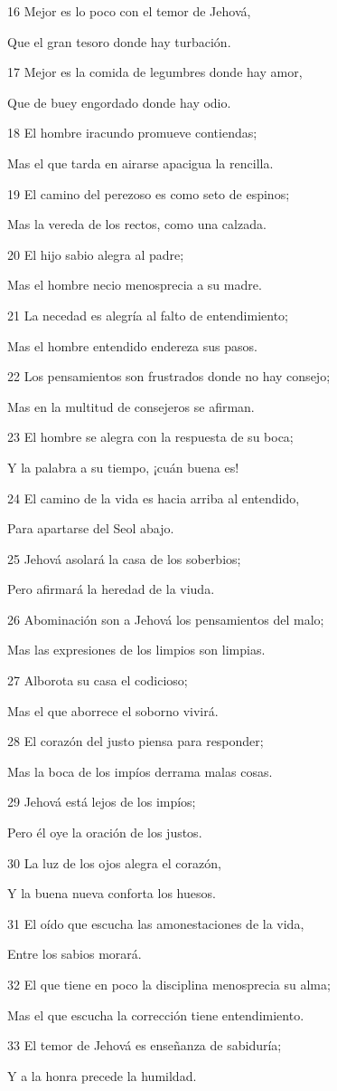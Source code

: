 \par 16 Mejor es lo poco con el temor de Jehová,
\par Que el gran tesoro donde hay turbación.
\par 17 Mejor es la comida de legumbres donde hay amor,
\par Que de buey engordado donde hay odio.
\par 18 El hombre iracundo promueve contiendas;
\par Mas el que tarda en airarse apacigua la rencilla.
\par 19 El camino del perezoso es como seto de espinos;
\par Mas la vereda de los rectos, como una calzada.
\par 20 El hijo sabio alegra al padre;
\par Mas el hombre necio menosprecia a su madre.
\par 21 La necedad es alegría al falto de entendimiento;
\par Mas el hombre entendido endereza sus pasos.
\par 22 Los pensamientos son frustrados donde no hay consejo;
\par Mas en la multitud de consejeros se afirman.
\par 23 El hombre se alegra con la respuesta de su boca;
\par Y la palabra a su tiempo, ¡cuán buena es!
\par 24 El camino de la vida es hacia arriba al entendido,
\par Para apartarse del Seol abajo.
\par 25 Jehová asolará la casa de los soberbios;
\par Pero afirmará la heredad de la viuda.
\par 26 Abominación son a Jehová los pensamientos del malo;
\par Mas las expresiones de los limpios son limpias.
\par 27 Alborota su casa el codicioso;
\par Mas el que aborrece el soborno vivirá.
\par 28 El corazón del justo piensa para responder;
\par Mas la boca de los impíos derrama malas cosas.
\par 29 Jehová está lejos de los impíos;
\par Pero él oye la oración de los justos.
\par 30 La luz de los ojos alegra el corazón,
\par Y la buena nueva conforta los huesos.
\par 31 El oído que escucha las amonestaciones de la vida,
\par Entre los sabios morará.
\par 32 El que tiene en poco la disciplina menosprecia su alma;
\par Mas el que escucha la corrección tiene entendimiento.
\par 33 El temor de Jehová es enseñanza de sabiduría;
\par Y a la honra precede la humildad.

